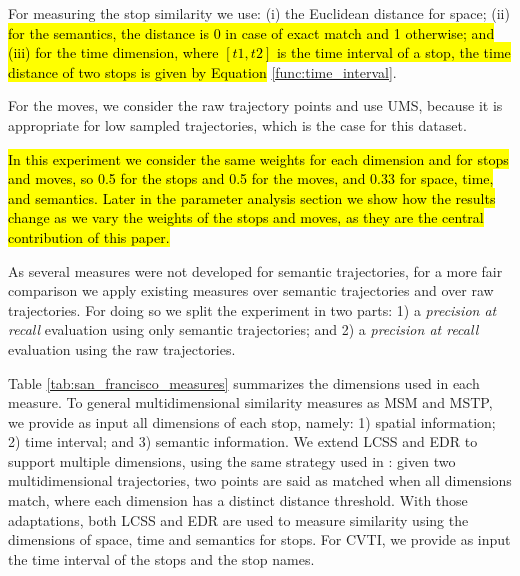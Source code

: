 \documentclass[12pt]{article}
\begin{document}
For measuring the stop similarity we use: (i) the Euclidean distance for space; (ii)\hl{ for the semantics, the distance is 0 in case of exact match and 1 otherwise; and (iii) for the time dimension, where $[t1, t2]$ is the time interval of a stop, the time distance of two stops is given by  Equation} \ref{func:time_interval}.




For the moves, we consider the raw trajectory points and use UMS, because it is appropriate for low sampled trajectories, which is the case for this dataset. %

\hl{In this experiment we consider the same weights for each dimension and for stops and moves, so 0.5 for the stops and 0.5 for the moves, and 0.33 for space, time, and semantics. Later in the parameter analysis section we show how the results change as we vary the weights of the stops and moves, as they are the central contribution of this paper.}

As several measures were not developed for semantic trajectories, for a more fair comparison we apply existing measures over semantic trajectories and over raw trajectories. For doing so we split the experiment in two parts: 1) a \textit{precision at recall} evaluation using only semantic trajectories; and 2) a \textit{precision at recall} evaluation using the raw trajectories.%

Table {\ref{tab:san_francisco_measures}} summarizes the dimensions used in each measure. To general multidimensional similarity measures as MSM and MSTP, we provide as input all dimensions of each stop, namely: 1)  spatial information; 2) time interval; and 3) semantic information. We extend LCSS and EDR to support multiple dimensions, using the same strategy used in {\cite{Furtado:TGIS12156}}: given two multidimensional trajectories, two points are said as matched when all dimensions match, where each dimension has a distinct distance threshold. With those adaptations, both LCSS and EDR are used to measure similarity using the dimensions of space, time and semantics for stops. For CVTI, we provide as input the time interval of the stops and the stop names.
\end{document}
